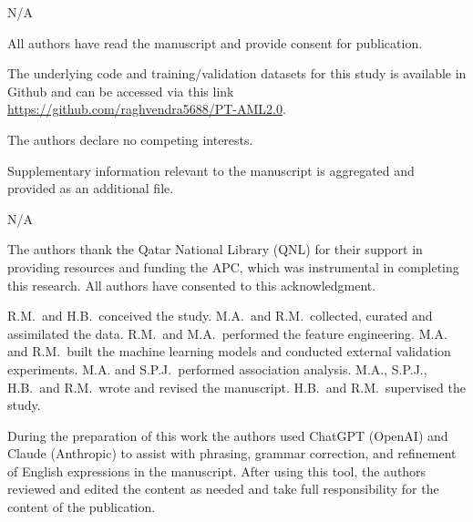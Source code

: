 \documentclass[pdflatex,sn-mathphys-num]{sn-jnl}
\theoremstyle{thmstyleone}
\theoremstyle{thmstyletwo}
\theoremstyle{thmstylethree}
\begin{document}
N/A

All authors have read the manuscript and provide consent for publication.

The underlying code and training/validation datasets for this study is available in Github and can be accessed via this link \url{https://github.com/raghvendra5688/PT-AML2.0}. 

The authors declare no competing interests.

Supplementary information relevant to the manuscript is aggregated and provided as an additional file.

N/A

The authors thank the Qatar National Library (QNL) for their support in providing resources and funding the APC, which was instrumental in completing this research. All authors have consented to this acknowledgment.

R.M.\ and H.B.\ conceived the study. M.A.\ and R.M.\ collected, curated and assimilated the data. R.M.\ and M.A.\ performed the feature engineering. M.A. and R.M.\ built the machine learning models and conducted external validation experiments. M.A. and S.P.J.\ performed association analysis. M.A., S.P.J., H.B.\ and R.M.\ wrote and revised the manuscript. H.B.\ and R.M.\ supervised the study.

During the preparation of this work the authors used ChatGPT (OpenAI) and Claude (Anthropic) to assist with phrasing, grammar correction, and refinement of English expressions in the manuscript. After using this tool, the authors reviewed and edited the content as needed and take full responsibility for the content of the publication.


\end{document}
